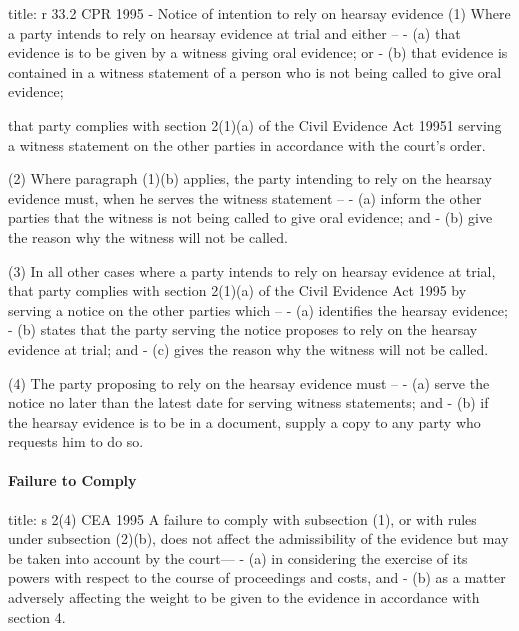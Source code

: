 \documentclass[
]{article}
\newenvironment{Shaded}{}{}
\newcommand{\NormalTok}[1]{#1}
\begin{document}
\begin{Shaded}
\begin{Highlighting}[]
\NormalTok{title: r 33.2 CPR 1995 {-} Notice of intention to rely on hearsay evidence}
\NormalTok{(1) Where a party intends to rely on hearsay evidence at trial and either –}
\NormalTok{{-} (a) that evidence is to be given by a witness giving oral evidence; or}
\NormalTok{{-} (b) that evidence is contained in a witness statement of a person who is not being called to give oral evidence;}

\NormalTok{that party complies with section 2(1)(a) of the Civil Evidence Act 19951 serving a witness statement on the other parties in accordance with the court’s order.}

\NormalTok{(2) Where paragraph (1)(b) applies, the party intending to rely on the hearsay evidence must, when he serves the witness statement –}
\NormalTok{{-} (a) inform the other parties that the witness is not being called to give oral evidence; and}
\NormalTok{{-} (b) give the reason why the witness will not be called.}

\NormalTok{(3) In all other cases where a party intends to rely on hearsay evidence at trial, that party complies with section 2(1)(a) of the Civil Evidence Act 1995 by serving a notice on the other parties which –}
\NormalTok{{-} (a) identifies the hearsay evidence;}
\NormalTok{{-} (b) states that the party serving the notice proposes to rely on the hearsay evidence at trial; and}
\NormalTok{{-} (c) gives the reason why the witness will not be called.}

\NormalTok{(4) The party proposing to rely on the hearsay evidence must –}
\NormalTok{{-} (a) serve the notice no later than the latest date for serving witness statements; and}
\NormalTok{{-} (b) if the hearsay evidence is to be in a document, supply a copy to any party who requests him to do so.}
\end{Highlighting}
\end{Shaded}

\hypertarget{failure-to-comply}{%
\paragraph{Failure to Comply}\label{failure-to-comply}}

\begin{Shaded}
\begin{Highlighting}[]
\NormalTok{title: s 2(4) CEA 1995}
\NormalTok{A failure to comply with subsection (1), or with rules under subsection (2)(b), does not affect the admissibility of the evidence but may be taken into account by the court—}
\NormalTok{{-} (a) in considering the exercise of its powers with respect to the course of proceedings and costs, and}
\NormalTok{{-} (b) as a matter adversely affecting the weight to be given to the evidence in accordance with section 4. }
\end{Highlighting}
\end{Shaded}
\end{document}
